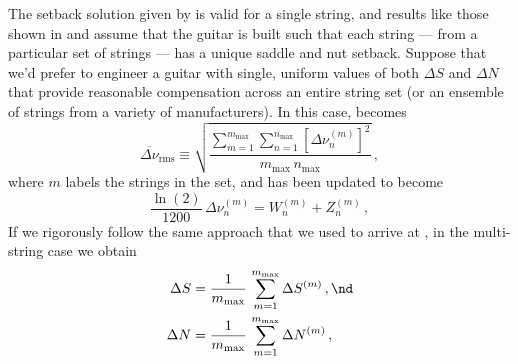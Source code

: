The setback solution given by  is valid for a single string, and results like those shown in  and  assume that the guitar is built such that each string --- from a particular set of strings --- has a unique saddle and nut setback. Suppose that we'd prefer to engineer a guitar with single, uniform values of both $\Delta S$ and $\Delta N$ that provide reasonable compensation across an entire string set (or an ensemble of strings from a variety of manufacturers). In this case,  becomes
 \begin{equation}\label{eqn:rms_def_m}
\overline{\Delta \nu}_\text{rms} \equiv \sqrt{\frac{\sum_{m = 1}^{m_\text{max}} \sum_{n = 1}^{n_\text{max}} \left[\Delta \nu^{(m)}_{n}\right]^2}{m_\text{max}\, n_\text{max}}}\, ,
 \end{equation}
where $m$ labels the strings in the set, and  has been updated to become
\begin{equation}%
  \frac{\ln(2)}{1200}\, \Delta \nu^{(m)}_n = W^{(m)}_n + Z^{(m)}_n\, ,
\end{equation}
If we rigorously follow the same approach that we used to arrive at , in the multi-string case we obtain
\begin{subequations}
  \begin{align}
    \Delta S &= \frac{1}{m_\text{max}}\, \sum_{m = 1}^{m_\text{max}} \Delta S^{(m)}\, , \nd \\
    \Delta N &= \frac{1}{m_\text{max}}\, \sum_{m = 1}^{m_\text{max}} \Delta N^{(m)}\, ,
  \end{align}
\end{subequations}
